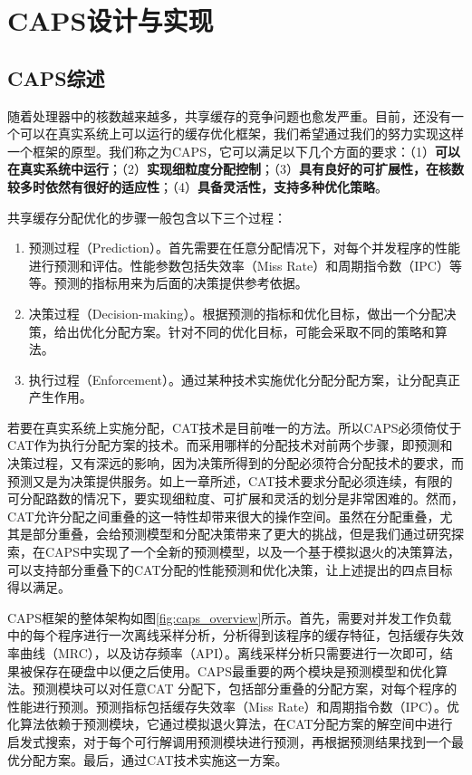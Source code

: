 
\chapter{CAPS设计与实现} \label{chap:design}
\section{CAPS综述}
随着处理器中的核数越来越多，共享缓存的竞争问题也愈发严重。目前，还没有一个可以在真实系统上可以运行的缓存优化框架，我们希望通过我们的努力实现这样一个框架的原型。我们称之为CAPS，它可以满足以下几个方面的要求：（1）\textbf{可以在真实系统中运行}；（2）\textbf{实现细粒度分配控制}；（3）\textbf{具有良好的可扩展性，在核数较多时依然有很好的适应性}；（4）\textbf{具备灵活性，支持多种优化策略}。

共享缓存分配优化的步骤一般包含以下三个过程：
\begin{enumerate}
\item 预测过程（Prediction）。首先需要在任意分配情况下，对每个并发程序的性能进行预测和评估。性能参数包括失效率（Miss Rate）和周期指令数（IPC）等等。预测的指标用来为后面的决策提供参考依据。
\item 决策过程（Decision-making）。根据预测的指标和优化目标，做出一个分配决策，给出优化分配方案。针对不同的优化目标，可能会采取不同的策略和算法。
\item 执行过程（Enforcement）。通过某种技术实施优化分配分配方案，让分配真正产生作用。
\end{enumerate}

若要在真实系统上实施分配，CAT技术是目前唯一的方法。所以CAPS必须倚仗于CAT作为执行分配方案的技术。而采用哪样的分配技术对前两个步骤，即预测和决策过程，又有深远的影响，因为决策所得到的分配必须符合分配技术的要求，而预测又是为决策提供服务。如上一章所述，CAT技术要求分配必须连续，有限的可分配路数的情况下，要实现细粒度、可扩展和灵活的划分是非常困难的。然而，CAT允许分配之间重叠的这一特性却带来很大的操作空间。虽然在分配重叠，尤其是部分重叠，会给预测模型和分配决策带来了更大的挑战，但是我们通过研究探索，在CAPS中实现了一个全新的预测模型，以及一个基于模拟退火的决策算法，可以支持部分重叠下的CAT分配的性能预测和优化决策，让上述提出的四点目标得以满足。

CAPS框架的整体架构如图\ref{fig:caps_overview}所示。首先，需要对并发工作负载中的每个程序进行一次离线采样分析，分析得到该程序的缓存特征，包括缓存失效率曲线（MRC），以及访存频率（API）。离线采样分析只需要进行一次即可，结果被保存在硬盘中以便之后使用。CAPS最重要的两个模块是预测模型和优化算法。预测模块可以对任意CAT 分配下，包括部分重叠的分配方案，对每个程序的性能进行预测。预测指标包括缓存失效率（Miss Rate）和周期指令数（IPC）。优化算法依赖于预测模块，它通过模拟退火算法，在CAT分配方案的解空间中进行启发式搜索，对于每个可行解调用预测模块进行预测，再根据预测结果找到一个最优分配方案。最后，通过CAT技术实施这一方案。

